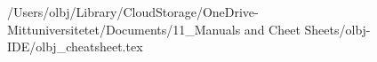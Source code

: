 /Users/olbj/Library/CloudStorage/OneDrive-Mittuniversitetet/Documents/11_Manuals and Cheet Sheets/olbj-IDE/olbj_cheatsheet.tex